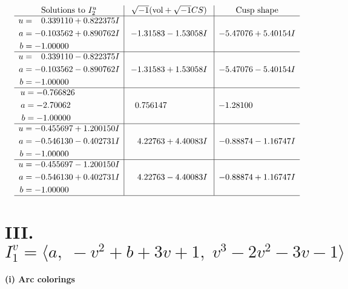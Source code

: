 \documentclass[1p]{elsarticle_modified}
\theoremstyle{definition}
\newcommand{\I}{\sqrt{-1}}
\begin{document}
$$\begin{array}{c|c|c}  
\text{Solutions to }I^u_{2}& \I (\text{vol} + \sqrt{-1}CS) & \text{Cusp shape}\\
 \hline 
\begin{aligned}
u &= \phantom{-}0.339110 + 0.822375 I \\
a &= -0.103562 + 0.890762 I \\
b &= -1.00000\phantom{ +0.000000I}\end{aligned}
 & -1.31583 - 1.53058 I & -5.47076 + 5.40154 I \\ \hline\begin{aligned}
u &= \phantom{-}0.339110 - 0.822375 I \\
a &= -0.103562 - 0.890762 I \\
b &= -1.00000\phantom{ +0.000000I}\end{aligned}
 & -1.31583 + 1.53058 I & -5.47076 - 5.40154 I \\ \hline\begin{aligned}
u &= -0.766826\phantom{ +0.000000I} \\
a &= -2.70062\phantom{ +0.000000I} \\
b &= -1.00000\phantom{ +0.000000I}\end{aligned}
 & \phantom{-}0.756147\phantom{ +0.000000I} & -1.28100\phantom{ +0.000000I} \\ \hline\begin{aligned}
u &= -0.455697 + 1.200150 I \\
a &= -0.546130 - 0.402731 I \\
b &= -1.00000\phantom{ +0.000000I}\end{aligned}
 & \phantom{-}4.22763 + 4.40083 I & -0.88874 - 1.16747 I \\ \hline\begin{aligned}
u &= -0.455697 - 1.200150 I \\
a &= -0.546130 + 0.402731 I \\
b &= -1.00000\phantom{ +0.000000I}\end{aligned}
 & \phantom{-}4.22763 - 4.40083 I & -0.88874 + 1.16747 I\\
 \hline 
 \end{array}$$\newpage\newpage\renewcommand{\arraystretch}{1}
\centering \section*{III. $I^v_{1}= \langle a,\;- v^2+b+3 v+1,\;v^3-2 v^2-3 v-1 \rangle$}
\flushleft \textbf{(i) Arc colorings}\\
\end{document}
